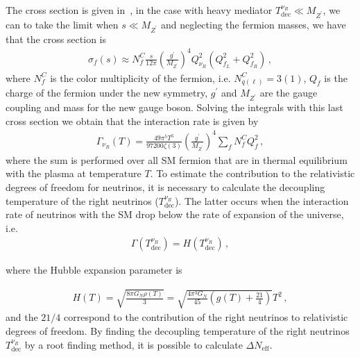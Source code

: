 \documentclass[12pt]{article}
\begin{document}
The cross section is given in~\cite{Barger:2003zh}, in the case with heavy mediator $T^{\nu_R}_{\text{dec}} \ll M_{Z^{\prime}}$, we can to take the limit when $s \ll M_{Z^{\prime}}$ and neglecting the fermion masses, we have that the cross section is
%
\begin{align*}
    \sigma_{f}(s) \approx N^{C}_{f} \frac{s}{12 \pi} \left( \frac{g^{\prime}}{M_{Z^{\prime}}} \right)^{4} Q^{2}_{\nu_R} (Q^{2}_{f_L} + Q^{2}_{f_R})\,,
\end{align*}
%
where $N^{C}_{f}$ is the color multiplicity of the fermion, i.e. $N^{C}_{q(\ell)} = 3(1)$, $Q_{f}$ is the charge of the fermion under the new symmetry, $g^{\prime}$ and $M_{Z^{\prime}}$ are the gauge coupling and mass for the new gauge boson. Solving the integrals with this last cross section we obtain that the interaction rate is given by
%
\begin{align*}
    \Gamma_{\nu_{R}}(T) = \frac{49 \pi^{5} T^{5}}{97200 \zeta(3)} \left( \frac{g^{\prime}}{M_{Z^{\prime}}} \right)^{4} \sum_{f} N^{C}_{f} Q^{2}_{f}\,,
\end{align*}
%
where the sum is performed over all SM fermion that are in thermal equilibrium with the plasma at temperature $T$. To estimate the contribution to the relativistic degrees of freedom for neutrinos, it is necessary to calculate the decoupling temperature of the right neutrinos ($T^{\nu_R}_{\text{dec}}$). The latter occurs when the interaction rate of neutrinos with the SM drop below the rate of expansion of the universe, i.e.
%
\begin{align*}
\Gamma(T^{\nu_R}_{\text{dec}}) = H(T^{\nu_R}_{\text{dec}})\,, 
\end{align*}


where the Hubble expansion parameter is


\begin{align*}
    H(T) = \sqrt{\frac{8 \pi G_{N} \rho(T)}{3}} = \sqrt{\frac{4 \pi^{3} G_{N}}{45} \left( g(T) + \frac{21}{4} \right)} T^{2}\,,
\end{align*}
%
and the $21/4$ correspond to the contribution of the right neutrinos to relativistic degrees of freedom. By finding the decoupling temperature of the right neutrinos $T^{\nu_R}_{\text{dec}} $ by a root finding method, it is possible to calculate $\Delta N_{\text{eff}}$.
\end{document}
